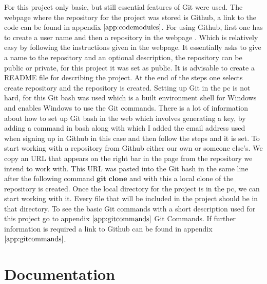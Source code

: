 For this project only basic, but still essential features of Git were used. The webpage where the repository for the project was stored is Github, a link to the code can be found in appendix $\ref{app:codemodules}$. For using Github, first one has to create a user name and then a repository in the webpage . Which is relatively easy by following the instructions given in the webpage. It essentially asks to give a name to the repository and an optional description, the repository can be public or private, for this project it was set as public. It is advisable to create a README file for describing the project. At the end of the steps one selects create repository and the repository is created. Setting up Git in the pc is not hard, for this Git bash was used which is a built environment shell for Windows and enables Windows to use the Git commands.
There is a lot of information about how to set up Git bash in the web which involves generating a key, by adding a command in bash along with which I added the email address used when signing up in Github in this case and then follow the steps and it is set. 
To start working with a repository from Github either our own or someone else's. We copy an URL that appears on the right bar in the page from the repository we intend to work with. 
This URL was pasted into the Git bash  in the same line after the following command $\textbf{git clone}$ and with this a local clone of the repository is created.
Once the local directory for the project is in the pc, we can start working with it. Every file that will be included in the project should be in that directory. To see the basic Git commands with a short description used for this project go to appendix $\ref{app:gitcommands}$ Git Commands. If further information is required a link to Github can be found in appendix $\ref{app:gitcommands}$.

\section{Documentation}

